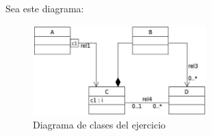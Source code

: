  Sea este diagrama:

\begin{figure}[h]
  \begin{center}
    \includegraphics[width=0.6\textwidth]{assets/Junio22_1.png}
  \end{center}  
  \caption{Diagrama de clases del ejercicio}
\end{figure}

